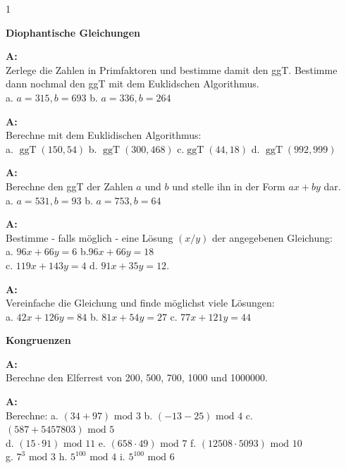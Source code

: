 \documentclass[landscape,twocolumn,a4paper]{article}
\begin{document}
\newcommand{\ggT}{\operatorname{ggT}}
\newcommand{\Mod}[3]{#1\equiv#2\text{ mod }#3}
\newcommand{\tmod}{\text{ mod }}
\newcommand\x{1}
\setcounter {y} {1}

\parindent 0mm

\textbf{Diophantische Gleichungen} 
\bigskip

\textbf{A:}   \\
Zerlege die Zahlen in Primfaktoren und bestimme damit den ggT. Bestimme dann nochmal den ggT mit
dem Euklidschen Algorithmus. \\
a.  $a = 315, b=693$ \quad b. $a=336,b=264$
\bigskip  {}

\textbf{A:}   \\
Berechne mit dem Euklidischen Algorithmus: \\
a.  $\ggT(150,54)$ \quad b. $\ggT(300,468)$ \quad 
 c.$\ggT(44,18)$ \quad d. $\ggT(992,999)$
\bigskip {}
 
\textbf{A:}   \\
Berechne den ggT der Zahlen $a$ und $b$ und stelle ihn in der Form $ax + by$ dar. \\
a.   $ a = 531, b = 93$  \quad b. $ a = 753, b = 64$
\bigskip {}

\textbf{A:}   \\
Bestimme - falls möglich - eine Lösung $(x/y)$ der angegebenen Gleichung: \\
a.  $96x+66y=6$ \quad b.$96x+66y=18$ \\
c.  $119x+143y=4$ \quad d. $91x+35y=12$.
\bigskip {}
 
 
 \textbf{A:}   \\
Vereinfache die Gleichung und finde möglichst viele Lösungen: \\
a.   $42x+126y=84$ \quad b. $81x+54y=27$ \quad 
 c. $77x+121y=44$ 
 \bigskip {}

 
 \textbf{Kongruenzen} \bigskip
 
 \textbf{A:}   \\
Berechne den Elferrest von 200, 500, 700, 1000 und 1000000.
\bigskip {}
 
 \textbf{A:}   \\
Berechne:
a. $(34 + 97) \tmod 3$ \quad b. $(-13-25) \tmod 4$ \quad c. $(587 + 5 457 803) \tmod 5$ \\
d. $(15 \cdot 91) \tmod 11$  \quad e. $(658 \cdot 49) \tmod 7$ \quad f. $(12508 \cdot 5093) \tmod 10$ \\
g. $7^3\tmod 3$  \quad h. $5^{100}\tmod 4$ \quad i. $5^{100}\tmod 6$
\bigskip {}
 
\end{document}
